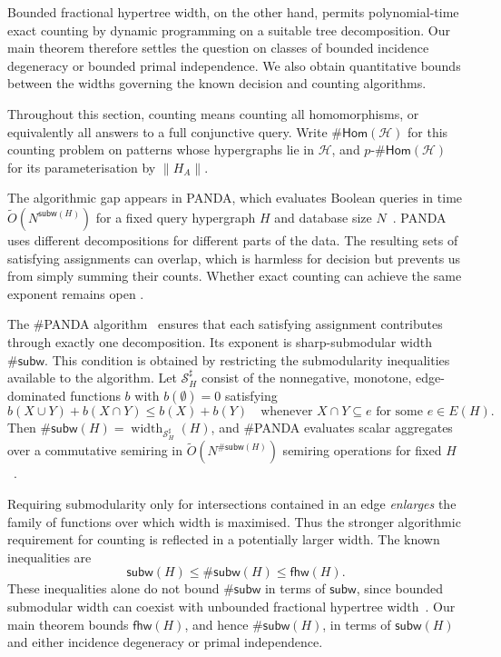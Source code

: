 \documentclass[11pt,letterpaper]{article}
\theoremstyle{definition}
\theoremstyle{remark}
\newcommand{\cH}{\mathcal H}
\newcommand{\fhw}{\mathsf{fhw}}
\newcommand{\subw}{\mathsf{subw}}
\newcommand{\sharpsubw}{\mathsf{\#subw}}
\providecommand{\subw}{\operatorname{subw}}
\providecommand{\fhw}{\operatorname{fhw}}
\begin{document}
Bounded fractional hypertree width, on the other hand, permits
polynomial-time exact counting by dynamic programming on a suitable tree
decomposition. Our main theorem therefore settles the question on classes
of bounded incidence degeneracy or bounded primal independence. We also
obtain quantitative bounds between the widths governing the known decision
and counting algorithms.

Throughout this section, counting means counting all homomorphisms,
or equivalently all answers to a full conjunctive query. Write
$\mathsf{\#Hom}(\cH)$ for this counting problem on patterns whose
hypergraphs lie in $\cH$, and $p\text{-}\mathsf{\#Hom}(\cH)$ for its
parameterisation by $\lVert H_A\rVert$.

The algorithmic gap appears in PANDA, which evaluates Boolean queries
in time $\widetilde O(N^{\subw(H)})$ for a fixed query hypergraph $H$
and database size $N$~\cite{KhamisNgoSuciu2025PANDA}.
PANDA uses different decompositions for different parts of the data.
The resulting sets of satisfying assignments can overlap, which is
harmless for decision but prevents us from simply summing their counts.
Whether exact counting can achieve the same exponent remains open
\cite[Section~8]{KoutrisEtAl2025FasterJoins}.

The \#PANDA algorithm~\cite{KhamisEtAl2019FAQAI} ensures that each satisfying assignment contributes
through exactly one decomposition. Its exponent is sharp-submodular
width $\sharpsubw$. This condition is obtained by restricting the
submodularity inequalities available to the algorithm. Let
$\mathcal S_H^\sharp$ consist of the nonnegative, monotone,
edge-dominated functions $b$ with $b(\emptyset)=0$ satisfying
\[
 b(X\cup Y)+b(X\cap Y)\le b(X)+b(Y)
 \quad\text{whenever }X\cap Y\subseteq e
 \text{ for some }e\in E(H).
\]
Then $\sharpsubw(H)=\operatorname{width}_{\mathcal S_H^\sharp}(H)$,
and \#PANDA evaluates scalar aggregates over a commutative semiring
in $\widetilde O(N^{\sharpsubw(H)})$ semiring operations for fixed
$H$~\cite{KhamisEtAl2019FAQAI}.

Requiring submodularity only for intersections contained in an edge
\emph{enlarges} the family of functions over which width is maximised.
Thus the stronger algorithmic requirement for counting is reflected
in a potentially larger width. The known inequalities are
\cite[Proposition~3.16]{KhamisEtAl2019FAQAI}
\[
 \subw(H)\le\sharpsubw(H)\le\fhw(H).
\]
These inequalities alone do not bound $\sharpsubw$ in terms of
$\subw$, since bounded submodular width can coexist with unbounded
fractional hypertree width~\cite{adw,Marx13}.
Our main theorem bounds $\fhw(H)$, and hence $\sharpsubw(H)$, in terms of
$\subw(H)$ and either incidence degeneracy or primal independence.
\end{document}
